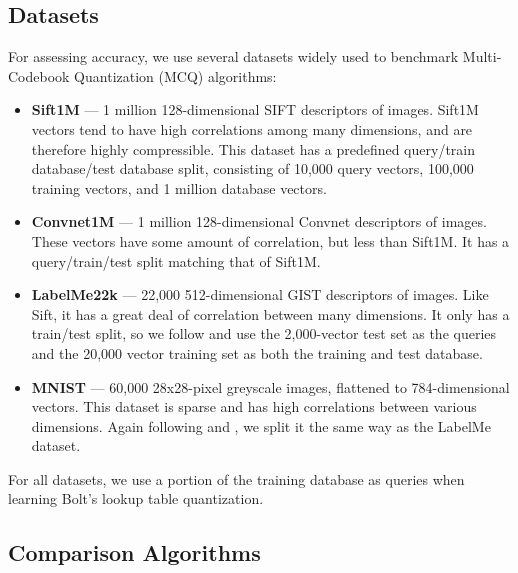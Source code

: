 \subsection{Datasets}

For assessing accuracy, we use several datasets widely used to benchmark Multi-Codebook Quantization (MCQ) algorithms:
\begin{itemize}[leftmargin=4mm]
\item \textbf{Sift1M} \cite{pq} --- 1 million 128-dimensional SIFT \cite{sift} descriptors of images. Sift1M vectors tend to have high correlations among many dimensions, and are therefore highly compressible. This dataset has a predefined query/train database/test database split, consisting of 10,000 query vectors, 100,000 training vectors, and 1 million database vectors.
\item \textbf{Convnet1M} \cite{stackedQuantizers} --- 1 million 128-dimensional Convnet descriptors of images. These vectors have some amount of correlation, but less than Sift1M. It has a query/train/test split matching that of Sift1M.
\item \textbf{LabelMe22k} \cite{minimalLossHashing} --- 22,000 512-dimensional GIST descriptors of images. Like Sift, it has a great deal of correlation between many dimensions. It only has a train/test split, so we follow \cite{lsq, cq} and use the 2,000-vector test set as the queries and the 20,000 vector training set as both the training and test database.
\item \textbf{MNIST} \cite{mnist} --- 60,000 28x28-pixel greyscale images, flattened to 784-dimensional vectors. This dataset is sparse and has high correlations between various dimensions. Again following \cite{lsq} and \cite{cq}, we split it the same way as the LabelMe dataset.
\end{itemize}

For all datasets, we use a portion of the training database as queries when learning Bolt's lookup table quantization.


\vspace{-2mm}
\subsection{Comparison Algorithms}


